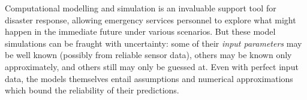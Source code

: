 Computational modelling and simulation is an invaluable support tool
for disaster response, allowing emergency services personnel to
explore what might happen in the immediate future under various
scenarios. But these model simulations can be fraught with
uncertainty: some of their \emph{input parameters} may be well known
(possibly from reliable sensor data), others may be known only
approximately, and others still may only be guessed at. Even with
perfect input data, the models themselves entail assumptions and
numerical approximations which bound the reliability of their
predictions.

















